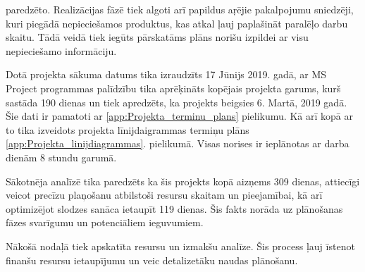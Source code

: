 paredzēto. Realizācijas fāzē tiek algoti arī papildus aŗējie pakalpojumu sniedzēji, kuri piegādā 
nepieciešamos produktus, kas atkal ļauj paplašināt paralēļo darbu skaitu.
Tādā veidā tiek iegūts pārskatāms plāns norišu izpildei ar visu nepieciešamo informāciju.
\par
Dotā projekta sākuma datums tika izraudzīts 17 Jūnijs 2019. gadā, ar MS Project programmas palīdzību
tika aprēķināts kopējais projekta garums, kurš sastāda 190 dienas un tiek apredzēts, ka projekts
beigsies 6. Martā, 2019 gadā. Šie dati ir pamatoti ar \ref{app:Projekta_terminu_plans} pielikumu.
Kā arī kopā ar to tika izveidots projekta līnijdaigrammas termiņu plāns \ref{app:Projekta_linijdiagrammas}.
pielikumā. Visas norises ir ieplānotas ar darba dienām 8 stundu garumā.
\par
Sākotnēja analīzē tika paredzēts ka šis projekts kopā aizņems 309 dienas, attiecīgi veicot precīzu
plaņošanu atbilstoši resursu skaitam un pieejamībai, kā arī optimizējot slodzes sanāca ietaupīt
119 dienas. Šis fakts norāda uz plānošanas fāzes svarīgumu un potenciāliem ieguvumiem.
\par
Nākošā nodaļā tiek apskatīta resursu un izmakšu analīze. Šis process ļauj īstenot finanšu resursu
ietaupījumu un veic detalizetāku naudas plānošanu.

